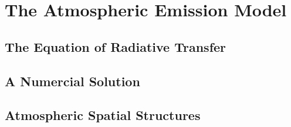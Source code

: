 \chapter{The Atmospheric Emission Model}

\section{The Equation of Radiative Transfer}

\section{A Numercial Solution}

\section{Atmospheric Spatial Structures}
